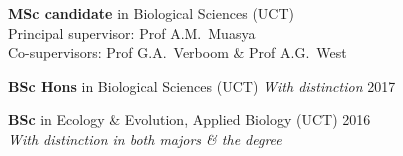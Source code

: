 \begin{hangparas}{2em}{1}

\textbf{MSc candidate} in Biological Sciences
  {\small (UCT)                                                               \\
  \hspace{2em} Principal supervisor: Prof A.M.~Muasya                         \\
  \hspace{2em} Co-supervisors: Prof G.A.~Verboom \& Prof A.G.~West}

\textbf{BSc Hons} in Biological Sciences
  {\small (UCT) \textit{With distinction}                         \hfill 2017}

\textbf{BSc} in Ecology \& Evolution, Applied Biology
  {\small (UCT)                                                   \hfill 2016 \\
  \hspace{2em} \textit{With distinction in both majors \& the degree}}

\end{hangparas}
